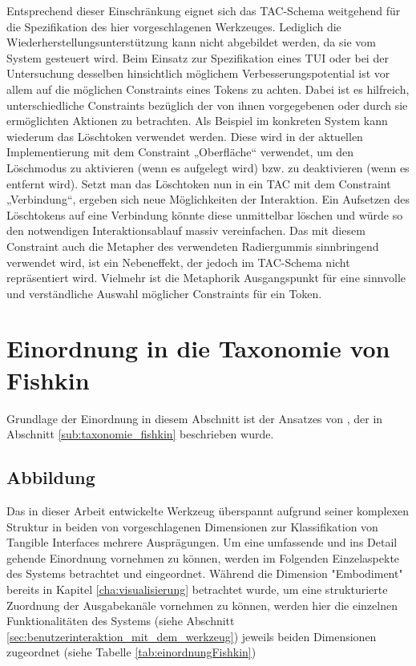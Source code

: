 Entsprechend dieser Einschränkung eignet sich das TAC-Schema weitgehend für die Spezifikation des hier vorgeschlagenen Werkzeuges. Lediglich die Wiederherstellungsunterstützung kann nicht abgebildet werden, da sie vom System gesteuert wird. Beim Einsatz zur Spezifikation eines \gls{TUI} oder bei der Untersuchung desselben hinsichtlich möglichem Verbesserungspotential ist vor allem auf die möglichen Constraints eines Tokens zu achten. Dabei ist es hilfreich, unterschiedliche Constraints bezüglich der von ihnen vorgegebenen oder durch sie ermöglichten Aktionen zu betrachten. Als Beispiel im konkreten System kann wiederum das Löschtoken verwendet werden. Diese wird in der aktuellen Implementierung mit dem Constraint „Oberfläche“ verwendet, um den Löschmodus zu aktivieren (wenn es aufgelegt wird) bzw. zu deaktivieren (wenn es entfernt wird). Setzt man das Löschtoken nun in ein TAC mit dem Constraint „Verbindung“, ergeben sich neue Möglichkeiten der Interaktion. Ein Aufsetzen des Löschtokens auf eine Verbindung könnte diese unmittelbar löschen und würde so den notwendigen Interaktionsablauf massiv vereinfachen. Das mit diesem Constraint auch die Metapher des verwendeten Radiergummis sinnbringend verwendet wird, ist ein Nebeneffekt, der jedoch im TAC-Schema nicht repräsentiert wird. Vielmehr ist die Metaphorik Ausgangspunkt für eine sinnvolle und verständliche Auswahl möglicher Constraints für ein Token.



\section{Einordnung in die Taxonomie von Fishkin} %
\label{sec:einordnung_in_die_taxonomie_von_fishkin}

Grundlage der Einordnung in diesem Abschnitt ist der Ansatzes von \citep{Fishkin04}, der in Abschnitt \ref{sub:taxonomie_fishkin} beschrieben wurde.

\subsection{Abbildung}
Das in dieser Arbeit entwickelte Werkzeug überspannt aufgrund seiner komplexen Struktur in beiden von \citeauthor{Fishkin04} vorgeschlagenen Dimensionen zur Klassifikation von Tangible Interfaces mehrere Ausprägungen. Um eine umfassende und ins Detail gehende Einordnung vornehmen zu können, werden im Folgenden Einzelaspekte des Systems betrachtet und eingeordnet. Während die Dimension "Embodiment" bereits in Kapitel \ref{cha:visualisierung} betrachtet wurde, um eine strukturierte Zuordnung der Ausgabekanäle vornehmen zu können, werden hier die einzelnen Funktionalitäten des Systems (siehe Abschnitt \ref{sec:benutzerinteraktion_mit_dem_werkzeug}) jeweils beiden Dimensionen zugeordnet (siehe Tabelle \ref{tab:einordnungFishkin})


